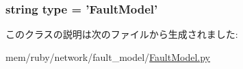 \label{classFaultModel_1_1FaultModel_a8dd936ea2844d2542ab577d434526255}
\hypertarget{classFaultModel_1_1FaultModel_acce15679d830831b0bbe8ebc2a60b2ca}{
\subsubsection[{type}]{\setlength{\rightskip}{0pt plus 5cm}string {\bf type} = '{\bf FaultModel}'}}
\label{classFaultModel_1_1FaultModel_acce15679d830831b0bbe8ebc2a60b2ca}


このクラスの説明は次のファイルから生成されました:\begin{DoxyCompactItemize}
\item 
mem/ruby/network/fault\_\-model/\hyperlink{FaultModel_8py}{FaultModel.py}\end{DoxyCompactItemize}
